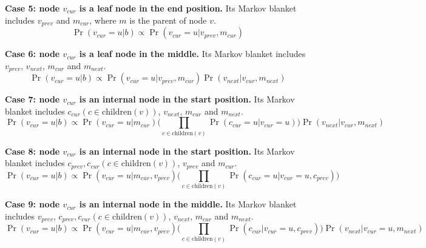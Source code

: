 \documentclass[11pt]{article}
\begin{document}
\textbf{Case 5: node $v_{cur}$ is a leaf node in the end position.}
Its Markov blanket includes $v_{prev}$ and $m_{cur}$, where
$m$ is the parent of node $v$.
\begin{equation*}
\Pr(v_{cur} = u|b)\propto \Pr(v_{cur} = u| v_{prev}, m_{cur})
\end{equation*}

\textbf{Case 6: node $v_{cur}$ is a leaf node in the middle.}
Its Markov blanket includes $v_{prev}$, $v_{next}$, $m_{cur}$ and $m_{next}$.
\begin{equation*}
\Pr(v_{cur} = u|b)\propto \Pr(v_{cur} = u| v_{prev}, m_{cur})  \Pr(v_{next}| v_{cur}, m_{next})
\end{equation*}

\textbf{Case 7: node $v_{cur}$ is an internal node in the start position.}
Its Markov blanket includes $c_{cur} (c\in \text{children}(v))$, $v_{next}$, $m_{cur}$ and $m_{next}$.
\begin{equation*}
\Pr(v_{cur} = u|b)\propto \Pr(v_{cur} = u| m_{cur}) \big(\prod_{c\in \text{children}(v)} \Pr(c_{cur} = u| v_{cur}=u)\big) \Pr(v_{next}| v_{cur}, m_{next})
\end{equation*}

\textbf{Case 8: node $v_{cur}$ is an internal node in the start position.}
Its Markov blanket includes $c_{prev}, c_{cur} (c\in \text{children}(v))$, $v_{prev}$ and $m_{cur}$.
\begin{equation*}
\Pr(v_{cur} = u|b)\propto \Pr(v_{cur} = u| m_{cur}, v_{prev}) \big(\prod_{c\in \text{children}(v)} \Pr(c_{cur} = u| v_{cur}=u, c_{prev})\big)
\end{equation*}

\textbf{Case 9: node $v_{cur}$ is an internal node in the middle.}
Its Markov blanket includes $v_{prev}$, $c_{prev}, c_{cur} (c\in \text{children}(v))$, $v_{next}$, $m_{cur}$ and $m_{next}$.
\begin{equation*}
\Pr(v_{cur} = u|b) \propto \Pr(v_{cur} = u| m_{cur}, v_{prev}) \big(\prod_{c\in \text{children}(v)} \Pr(c_{cur}| v_{cur}=u, c_{prev})\big)\Pr(v_{next} | v_{cur}=u, m_{next})
\end{equation*}



\end{document}
